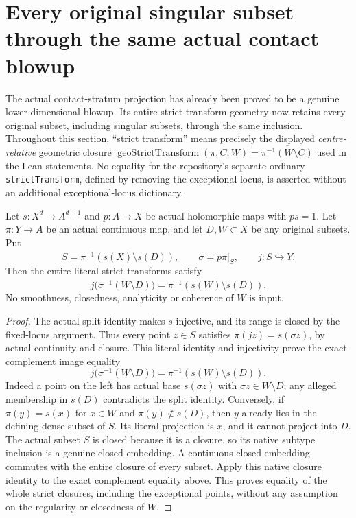 \section{Every original singular subset through the same actual contact blowup}

The actual contact-stratum projection has already been proved to be a genuine
lower-dimensional blowup. Its entire strict-transform geometry now retains
every original subset, including singular subsets, through the same inclusion.
Throughout this section, ``strict transform'' means precisely the displayed
\emph{centre-relative} geometric closure
$\operatorname{geoStrictTransform}(\pi,C,W)
=\overline{\pi^{-1}(W\setminus C)}$ used in the Lean statements.
No equality for the repository's separate ordinary
\texttt{strictTransform}, defined by removing the exceptional locus, is
asserted without an additional exceptional-locus dictionary.

\begin{theorem}
\label{hir:actual-contact-every-subset-strict-transform}
\leanok
Let $s:X^d\to A^{d+1}$ and $p:A\to X$ be actual holomorphic maps
with $ps=1$. Let $\pi:Y\to A$ be an actual continuous map, and let
$D,W\subset X$ be any original subsets. Put
\[
 S=\overline{\pi^{-1}(s(X)\setminus s(D))},\qquad
 \sigma=p\pi|_S,\qquad j:S\hookrightarrow Y.
\]
Then the entire literal strict transforms satisfy
\[
 j\bigl(\overline{\sigma^{-1}(W\setminus D)}\bigr)
 =\overline{\pi^{-1}(s(W)\setminus s(D))}.
\]
No smoothness, closedness, analyticity or coherence of $W$ is input.
\end{theorem}
\begin{proof}
The actual split identity makes $s$ injective, and its range is closed by
the fixed-locus argument. Thus every point $z\in S$ satisfies
$\pi(jz)=s(\sigma z)$, by actual continuity and closure. This literal
identity and injectivity prove the exact complement image equality
\[
 j\bigl(\sigma^{-1}(W\setminus D)\bigr)
 =\pi^{-1}(s(W)\setminus s(D)).
\]
Indeed a point on the left has actual base $s(\sigma z)$ with
$\sigma z\in W\setminus D$; any alleged membership in $s(D)$ contradicts
the split identity. Conversely, if $\pi(y)=s(x)$ for $x\in W$ and
$\pi(y)\notin s(D)$, then $y$ already lies in the defining dense subset
of $S$. Its literal projection is $x$, and it cannot project into $D$.
The actual subset $S$ is closed because it is a closure, so its native
subtype inclusion is a genuine closed embedding. A continuous closed
embedding commutes with the entire closure of every subset. Apply this
native closure identity to the exact complement equality above. This
proves equality of the whole strict closures, including the exceptional
points, without any assumption on the regularity or closedness of $W$.
\end{proof}

